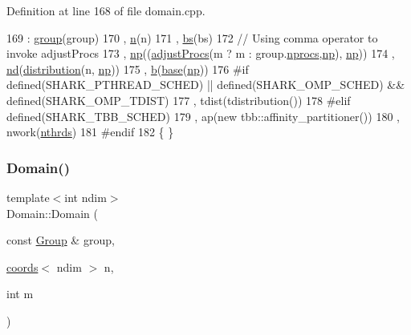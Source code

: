Definition at line 168 of file domain.\+cpp.


\begin{DoxyCode}
169         : \hyperlink{classshark_1_1ndim_1_1_domain_a2bbf100371762ce405efd218bc1e3d0f}{group}(group)
170         , \hyperlink{classshark_1_1ndim_1_1_domain_ab942ffcf99c5ee0f2589c8b9104abcfd}{n}(n)
171         , \hyperlink{classshark_1_1ndim_1_1_domain_a2be17b3d153f7fbbede6eec0afd17ebe}{bs}(bs)
172         \textcolor{comment}{// Using comma operator to invoke adjustProcs}
173         , \hyperlink{classshark_1_1ndim_1_1_domain_a1d15ab99cb54dcc456c5bba8699bcddf}{np}((\hyperlink{classshark_1_1ndim_1_1_domain_a6d8aabbf8423bae3e392a4a87caf2185}{adjustProcs}(m ? m : group.\hyperlink{classshark_1_1_group_a90e041a7fa6c40c924b17f8c2006e6b2}{nprocs},\hyperlink{classshark_1_1ndim_1_1_domain_a1d15ab99cb54dcc456c5bba8699bcddf}{np}), \hyperlink{classshark_1_1ndim_1_1_domain_a1d15ab99cb54dcc456c5bba8699bcddf}{np}))
174         , \hyperlink{classshark_1_1ndim_1_1_domain_a4964336cc4ccdb2bfcc616fdcbb9a570}{nd}(\hyperlink{classshark_1_1ndim_1_1_domain_ad9cdf348ad0d1c8fe06965b3e9b3a5d0}{distribution}(n, \hyperlink{classshark_1_1ndim_1_1_domain_a1d15ab99cb54dcc456c5bba8699bcddf}{np}))
175         , \hyperlink{classshark_1_1ndim_1_1_domain_a3b9ed7ea09cc2d90575a43f92cc4e105}{b}(\hyperlink{classshark_1_1ndim_1_1_domain_a9335637df58667fdf13f6f861281c973}{base}(\hyperlink{classshark_1_1ndim_1_1_domain_a1d15ab99cb54dcc456c5bba8699bcddf}{np}))
176 \textcolor{preprocessor}{#if defined(SHARK\_PTHREAD\_SCHED) || defined(SHARK\_OMP\_SCHED) && defined(SHARK\_OMP\_TDIST)}
177         , tdist(tdistribution())
178 \textcolor{preprocessor}{#elif defined(SHARK\_TBB\_SCHED)}
179         , ap(\textcolor{keyword}{new} tbb::affinity\_partitioner())
180         , nwork(\hyperlink{namespaceshark_a4912c1d983c9655b4ed992ac1f99530f}{nthrds})
181 \textcolor{preprocessor}{#endif}
182 \{ \}
\end{DoxyCode}
\hypertarget{classshark_1_1ndim_1_1_domain_afcd66729a7f0bc45865e19ea0c920725}{}\label{classshark_1_1ndim_1_1_domain_afcd66729a7f0bc45865e19ea0c920725} 
\subsubsection{\texorpdfstring{Domain()}{Domain()}\hspace{0.1cm}{\footnotesize\ttfamily [2/4]}}
{\footnotesize\ttfamily template$<$int ndim$>$ \\
Domain\+::\+Domain (\begin{DoxyParamCaption}\item[{const \hyperlink{classshark_1_1_group}{Group} \&}]{group,  }\item[{\hyperlink{structshark_1_1ndim_1_1coords}{coords}$<$ ndim $>$}]{n,  }\item[{int}]{m }\end{DoxyParamCaption})}



